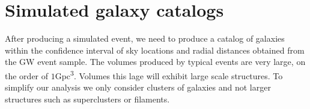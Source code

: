 





\section{\label{sec:appendix} Simulated galaxy catalogs}
After producing a simulated event, we need to produce a catalog of galaxies within the confidence interval of sky locations and radial distances obtained from the GW event sample. The volumes produced by typical events are very large, on the order of $1$\si{Gpc^3}. Volumes this lage will exhibit large scale structures. To simplify our analysis we only consider clusters of galaxies and not larger structures such as superclusters or filaments.

